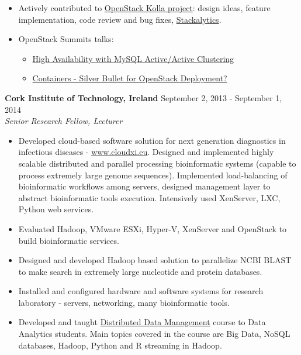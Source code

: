 \documentclass[a4paper,12pt,]{article}
\begin{document}
\begin{description}
\begin{itemize}
    \item Actively contributed to \href{https://docs.openstack.org/developer/kolla-ansible}{OpenStack Kolla project}: design ideas, feature implementation, code review and bug fixes, \href{http://stackalytics.com/?release=all&user_id=vlad-belogrudov&metric=commits}{Stackalytics}.

    \item OpenStack Summits talks:
       \begin{itemize}
       \item \href{https://youtu.be/RJf7cwkytOE}{High Availability with MySQL Active/Active Clustering}
       \item \href{https://youtu.be/wzN3RHnVWdQ}{Containers - Silver Bullet for OpenStack Deployment?}
       \end{itemize}
    \end{itemize}

  \item{\bfseries Cork Institute of Technology, Ireland} \hfill September 2, 2013 - September 1, 2014 \\
    {\em Senior Research Fellow, Lecturer}

    \begin{itemize}

    \item Developed cloud-based software solution for next generation diagnostics in infectious diseases - \url{www.cloudxi.eu}. Designed and implemented highly scalable distributed and parallel processing bioinformatic systems (capable to process extremely large genome sequences). Implemented load-balancing of bioinformatic workflows among servers, designed management layer to abstract bioinformatic tools execution. Intensively used XenServer, LXC, Python web services.

    \item Evaluated Hadoop, VMware ESXi, Hyper-V, XenServer and OpenStack to build bioinformatic services.

    \item Designed and developed Hadoop based solution to parallelize NCBI BLAST to make search in extremely large nucleotide and protein databases.

    \item Installed and configured hardware and software systems for research laboratory - servers, networking, many bioinformatic tools.

    \item Developed and taught \href{https://courses.cit.ie/index.cfm/page/module/moduleId/13651}{Distributed Data Management} course to Data Analytics students. Main topics covered in the course are Big Data, NoSQL databases, Hadoop, Python and R streaming in Hadoop.


\end{itemize}
\end{description}
\end{document}

